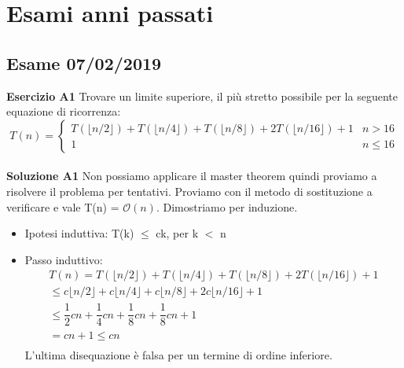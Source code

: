 \documentclass[../cheatSheetAlgoritmi.tex]{subfiles}
\begin{document}
\section{Esami anni passati}
\subsection{Esame 07/02/2019}
\textbf{Esercizio A1} Trovare un limite superiore, il più stretto possibile per la seguente equazione di ricorrenza: \
\begin{equation*}
  	T(n)=\begin{cases}
    	T(\lfloor n/2 \rfloor) + T(\lfloor n/4 \rfloor)+ T(\lfloor n/8 \rfloor)+ 2T(\lfloor n/16 \rfloor) + 1 & \text{$n > 16$}\\
    	1 & \text{$n \leq 16$}
  	\end{cases}
\end{equation*} \\
\textbf{Soluzione A1} Non possiamo applicare il master theorem quindi proviamo a risolvere il problema per tentativi. Proviamo con il metodo di sostituzione a verificare e vale T(n) = $\mathcal{O}(n)$. Dimostriamo per induzione.\
\begin{itemize}
	\item Ipotesi induttiva: T(k) $\leq$ ck, per k $<$ n
	\item Passo induttivo:
\begin{equation*}
\begin{aligned}	
T(n)= T(\lfloor n/2 \rfloor) + T(\lfloor n/4 \rfloor)+ T(\lfloor n/8 \rfloor)+ 2T(\lfloor n/16 \rfloor) + 1\\
\text{$\leq$} c\lfloor n/2 \rfloor + c\lfloor n/4 \rfloor+ c\lfloor n/8 \rfloor+ 2c\lfloor n/16 \rfloor + 1\\ 
\text{$\leq$}  \dfrac{1}{2}cn + \dfrac{1}{4}cn + \dfrac{1}{8}cn + \dfrac{1}{8}cn + 1\\
=  cn + 1 \text{$\leq$} cn \\
\end{aligned}
\end{equation*}
L'ultima disequazione è falsa per un termine di ordine inferiore. 
\end{itemize}
\end{document}
